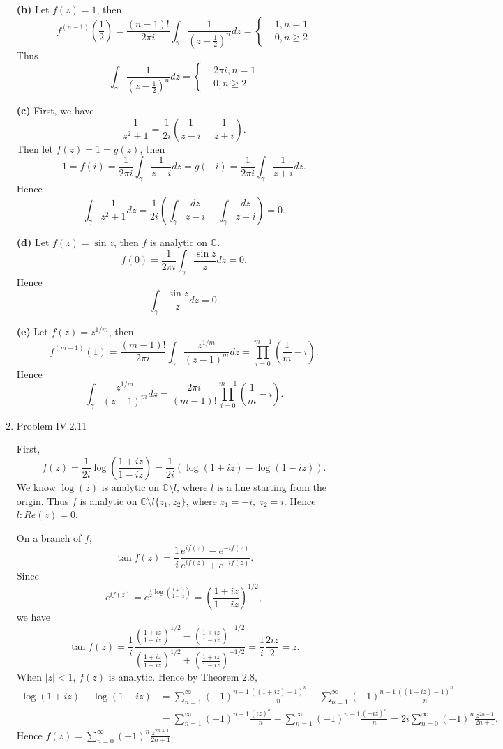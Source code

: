 \documentclass{article}%
\begin{document}
\begin{enumerate}
\textbf{(b)}
Let $f(z) = 1$, then 
$$
f^{(n-1)}(\frac{1}{2}) = \frac{(n-1)!}{2\pi i}\int_{\gamma}\frac{1}{(z-\frac{1}{2})^n} dz = \left\{
\begin{aligned}
& 1, n = 1 \\
& 0, n \ge 2
\end{aligned}
\right.
$$
Thus
$$
\int_{\gamma}\frac{1}{(z-\frac{1}{2})^n} dz = \left\{
\begin{aligned}
& 2\pi i, n = 1 \\
& 0, n \ge 2
\end{aligned}
\right.
$$

\textbf{(c)}
First, we have
$$
\frac{1}{z^2+1} = \frac{1}{2i}(\frac{1}{z-i}-\frac{1}{z+i}).
$$
Then let $f(z) = 1 = g(z)$, then
$$
1 = f(i) = \frac{1}{2\pi i}\int_{\gamma}\frac{1}{z-i}dz = g(-i) = \frac{1}{2\pi i}\int_{\gamma}\frac{1}{z+i}dz.
$$
Hence 
$$
\int_{\gamma}\frac{1}{z^2+1}dz = \frac{1}{2i}(\int_\gamma\frac{dz}{z-i}-\int_\gamma\frac{dz}{z+i}) = 0.
$$

\textbf{(d)}
Let $f(z) = \sin z$, then $f$ is analytic on $\mathbb{C}$.
$$
f(0) = \frac{1}{2\pi i}\int_{\gamma}\frac{\sin z}{z}dz = 0.
$$
Hence
$$
\int_\gamma \frac{\sin z}{z}dz = 0.
$$

\textbf{(e)}
Let $f(z) = z^{1/m} $, then
$$
f^{(m-1)}(1) = \frac{(m-1)!}{2\pi i}\int_{\gamma}\frac{z^{1/m}}{(z-1)^m}dz = \prod_{i=0}^{m-1}(\frac{1}{m}-i).
$$
Hence
$$
\int_{\gamma}\frac{z^{1/m}}{(z-1)^m}dz  = \frac{2\pi i}{(m-1)!}\prod_{i=0}^{m-1}(\frac{1}{m}-i).
$$


\item Problem IV.2.11

First, 
$$
f(z) = \frac{1}{2i}\log(\frac{1+iz}{1-iz}) = \frac{1}{2i}(\log(1+iz)-\log(1-iz)).
$$
We know $\log(z)$ is analytic on $\mathbb{C}\setminus l$, where $l$ is a line starting from the origin. Thus $f$ is analytic on $\mathbb{C}\setminus l\{z_1, z_2\}$, where $z_1 = -i, ~z_2 = i $. Hence $l: Re(z) = 0 $.

On a branch of $f$, 
$$
\tan f(z) = \frac{1}{i}\frac{e^{if(z)}-e^{-if(z)}}{e^{if(z)}+e^{-if(z)}}.
$$
Since
$$
e^{if(z)} = e^{\frac{1}{2}\log(\frac{1+iz}{1-iz})} = (\frac{1+iz}{1-iz})^{1/2},
$$
we have
$$
\tan f(z) = \frac{1}{i}\frac{(\frac{1+iz}{1-iz})^{1/2}-(\frac{1+iz}{1-iz})^{-1/2}}{(\frac{1+iz}{1-iz})^{1/2}+(\frac{1+iz}{1-iz})^{-1/2}} = \frac{1}{i}\frac{2iz}{2} = z.
$$
When $|z| < 1$, $f(z)$ is analytic. Hence by Theorem 2.8, 
$$
\begin{aligned}
\log(1+iz) - \log(1-iz) &= \sum_{n=1}^{\infty}(-1)^{n-1}\frac{((1+iz)-1)^n}{n}-\sum_{n=1}^{\infty}(-1)^{n-1}\frac{((1-iz)-1)^n}{n} \\
&= \sum_{n=1}^{\infty}(-1)^{n-1}\frac{(iz)^n}{n}-\sum_{n=1}^{\infty}(-1)^{n-1}\frac{(-iz)^n}{n} = 2i\sum_{n=0}^{\infty}(-1)^n\frac{z^{2n+1}}{2n+1}.
\end{aligned}
$$
Hence $f(z) = \sum\limits_{n=0}^{\infty}(-1)^n\frac{z^{2n+1}}{2n+1} $.



\end{enumerate}
\end{document}
